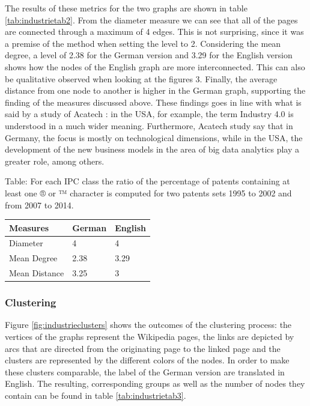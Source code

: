 \documentclass[]{book}
\begin{document}
The results of these metrics for the two graphs are shown in table
\ref{tab:industrietab2}. From the diameter measure we can see that all
of the pages are connected through a maximum of 4 edges. This is not
surprising, since it was a premise of the method when setting the level
to 2. Considering the mean degree, a level of 2.38 for the German
version and 3.29 for the English version shows how the nodes of the
English graph are more interconnected. This can also be qualitative
observed when looking at the figures 3. Finally, the average distance
from one node to another is higher in the German graph, supporting the
finding of the measures discussed above. These findings goes in line
with what is said by a study of Acatech \citep{kagermann2006industry}:
in the USA, for example, the term Industry 4.0 is understood in a much
wider meaning. Furthermore, Acatech study say that in Germany, the focus
is mostly on technological dimensions, while in the USA, the development
of the new business models in the area of big data analytics play a
greater role, among others.

Table: \label{tab:industrietab2} For each IPC class the ratio of the
percentage of patents containing at least one ® or ™ character is
computed for two patents sets 1995 to 2002 and from 2007 to 2014.

\begin{tabular}{l|l|l}
\hline
Measures & German & English\\
\hline
Diameter & 4 & 4\\
\hline
Mean Degree & 2.38 & 3.29\\
\hline
Mean Distance & 3.25 & 3\\
\hline
\end{tabular}

\subsubsection*{Clustering}\label{clustering-1}

Figure \ref{fig:industrieclusters} shows the outcomes of the clustering
process: the vertices of the graphs represent the Wikipedia pages, the
links are depicted by arcs that are directed from the originating page
to the linked page and the clusters are represented by the different
colors of the nodes. In order to make these clusters comparable, the
label of the German version are translated in English. The resulting,
corresponding groups as well as the number of nodes they contain can be
found in table \ref{tab:industrietab3}.
\end{document}
